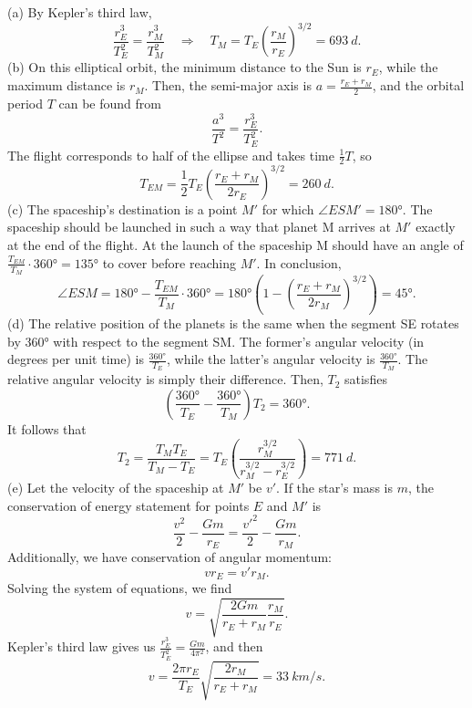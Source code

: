 \documentclass[../TST.tex]{subfiles}
\begin{document}
\ifprob \else
	\begin{solution} (a) By Kepler's third law, 
\begin{equation*}
	\frac{r_E^3}{T_E^2}=\frac{r_M^3}{T_M^2} \quad\Rightarrow\quad \boxed{T_M=T_E \left(\frac{r_M}{r_E}\right)^{3/2}=\qty{693}{d}.}
\end{equation*}
(b) On this elliptical orbit, the minimum distance to the Sun is $r_E$, while the maximum distance is $r_M$. Then, the semi-major axis is $a=\frac{r_E+r_M}{2}$, and the orbital period $T$ can be found from 
\begin{equation*}
\frac{a^3}{T^2}=\frac{r_E^3}{T_E^2}
.
\end{equation*}
The flight corresponds to half of the ellipse and takes time $\frac{1}{2}T$, so
\begin{equation*}
	\boxed{T_{EM}=\frac{1}{2}T_E \left(\frac{r_E+r_M}{2r_E}\right)^{3/2}=\qty{260}{d}.}
\end{equation*}
(c) The spaceship's destination is a point $M'$ for which $\angle ESM'=\ang{180}$. The spaceship should be launched in such a way that planet M arrives at $M'$ exactly at the end of the flight. At the launch of the spaceship M should have an angle of $\frac{T_{EM}}{T_M}\cdot \ang{360}=\ang{135}$ to cover before reaching $M'$. In conclusion,
\begin{equation*}
	\angle ESM= \ang{180}-\frac{T_{EM}}{T_M}\cdot \ang{360}=\boxed{\ang{180}\left(1-\left(\frac{r_E+r_M}{2r_M}\right)^{3/2} \right) = \ang{45}.}
\end{equation*}
(d) The relative position of the planets is the same when the segment SE rotates by $\ang{360}$ with respect to the segment SM. The former's angular velocity (in degrees per unit time) is $\frac{\ang{360}}{T_E}$, while the latter's angular velocity is $\frac{\ang{360}}{T_M}$. The relative angular velocity is simply their difference. Then, $T_2$ satisfies
\begin{equation*}
	\left(\frac{\ang{360}}{T_E}-\frac{\ang{360}}{T_M}\right) T_2=\ang{360}
.
\end{equation*}
It follows that
\begin{equation*}
	T_2=\frac{T_MT_E}{T_M-T_E}=\boxed{T_E \left(\frac{r_M^{3/2}}{r_M^{3/2}-r_E^{3/2}}\right)= \qty{771}{d}.}
\end{equation*}
(e) Let the velocity of the spaceship at $M'$ be $v'$. If the star's mass is $m$, the conservation of energy statement for points $E$ and $M'$ is 
\begin{equation*}
\frac{v^2}{2}-\frac{Gm}{r_E}=\frac{v'^2}{2}-\frac{Gm}{r_M}
.
\end{equation*}
Additionally, we have conservation of angular momentum:
\begin{equation*}
vr_E=v'r_M
.
\end{equation*}
Solving the system of equations, we find
\begin{equation*}
	v=\sqrt{\frac{2Gm}{r_E+r_M}\frac{r_M}{r_E}}
.
\end{equation*}
Kepler's third law gives us $\frac{r_E^3}{T_E^2}=\frac{Gm}{4\pi^2}$, and then
\begin{equation*}
	\boxed{v=\frac{2\pi r_E}{T_E}\sqrt{\frac{2r_M}{r_E+r_M}}=\qty{33}{km/s}.}
\end{equation*}

\end{solution}
\fi
\ifprob 
	\clearpage
\else 
	\clearpage
\fi
\end{document}
